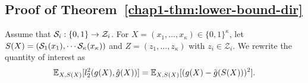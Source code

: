 {\subsection{Proof of
Theorem~\ref{chap1-thm:lower-bound-dir}}
\label{chap1-sub:proof_thm_lower-bound-dir}

Assume that $\mathcal{S}_i : \{0,1\} \rightarrow \mathcal{Z}_i$.
For 
$X = (x_1, \ldots, x_\kappa) \in \{0,1\}^\kappa$, 
let $S(X) = (\mathcal{S}_1(x_1), \cdots \mathcal{S}_\kappa(x_\kappa))$ and
$Z = (z_1, \ldots, z_\kappa)$ with $z_i \in \mathcal{Z}_i$. 
We rewrite the quantity of interest as
\[
  \mathbb{E}_{X, S(X)}[l_2^2(g(X), \hat{g}(X))] = \mathbb{E}_{X, S(X)}[(g(X)- \tilde{g}(S(X)))^2].
\]

}
